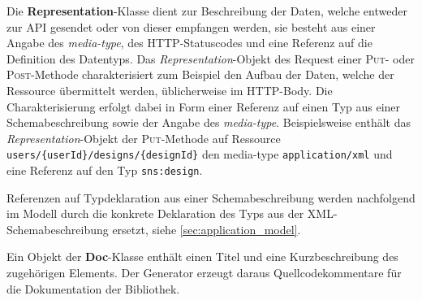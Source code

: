 Die \textbf{Representation}-Klasse dient zur Beschreibung der Daten, welche entweder zur \gls{API} gesendet oder von dieser empfangen werden, sie besteht aus einer Angabe des \emph{media-type}, des \gls{HTTP}-Statuscodes und eine Referenz auf die Definition des Datentyps. Das \emph{Representation}-Objekt des Request einer \textsc{Put}- oder \textsc{Post}-Methode charakterisiert zum Beispiel den Aufbau der Daten, welche der Ressource übermittelt werden, üblicherweise im \gls{HTTP}-Body. Die Charakterisierung erfolgt dabei in Form einer Referenz auf einen Typ aus einer Schemabeschreibung sowie der Angabe des \emph{media-type}. Beispielsweise enthält das \emph{Representation}-Objekt der \textsc{Put}-Methode auf Ressource \texttt{users/\{userId\}/designs/\{designId\}} den media-type \texttt{application/xml} und eine Referenz auf den Typ \texttt{sns:design}. 

Referenzen auf Typdeklaration aus einer Schemabeschreibung werden nachfolgend im Modell durch die konkrete Deklaration des Typs aus der \gls{XML}-Schemabeschreibung ersetzt, siehe \cref{sec:application_model}. 

Ein Objekt der \textbf{Doc}-Klasse enthält einen Titel und eine Kurzbeschreibung des zugehörigen Elements.
Der Generator erzeugt daraus Quellcodekommentare für die Dokumentation der Bibliothek.